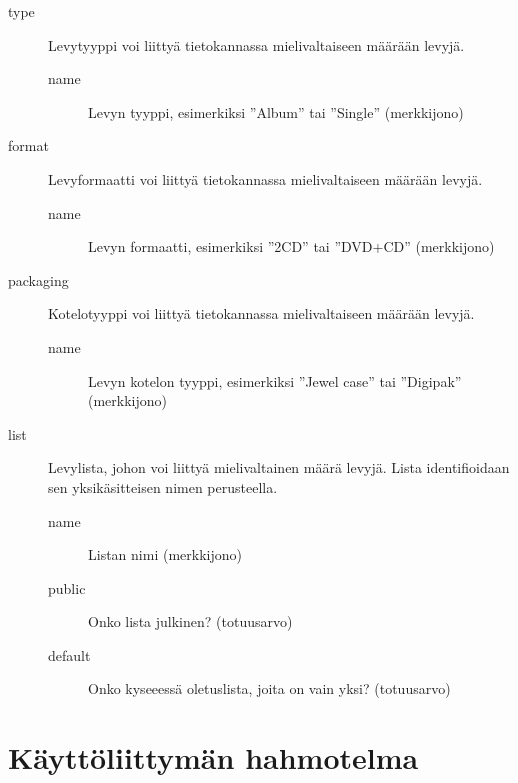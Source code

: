 \documentclass[a4paper,12pt]{report}
\begin{document}
\begin{description}
  \item[type]
    Levytyyppi voi liittyä tietokannassa mielivaltaiseen määrään levyjä.
    \begin{description}
      \item[name] Levyn tyyppi, esimerkiksi ''Album'' tai ''Single''
        (merkkijono)
    \end{description}

  \item[format]
    Levyformaatti voi liittyä tietokannassa mielivaltaiseen määrään levyjä.
    \begin{description}
      \item[name] Levyn formaatti, esimerkiksi ''2CD'' tai ''DVD+CD''
        (merkkijono)
    \end{description}

  \item[packaging]
    Kotelotyyppi voi liittyä tietokannassa mielivaltaiseen määrään levyjä.
    \begin{description}
      \item[name] Levyn kotelon tyyppi, esimerkiksi ''Jewel case'' tai
        ''Digipak'' (merkkijono)
    \end{description}

  \item[list]
    Levylista, johon voi liittyä mielivaltainen määrä levyjä.
    Lista identifioidaan sen yksikäsitteisen nimen perusteella.
    \begin{description}
      \item[name] Listan nimi (merkkijono)
      \item[public] Onko lista julkinen? (totuusarvo)
      \item[default] Onko kyseeessä oletuslista, joita on vain yksi?
        (totuusarvo)
    \end{description}

\end{description}

\section{Käyttöliittymän hahmotelma}
\end{document}
